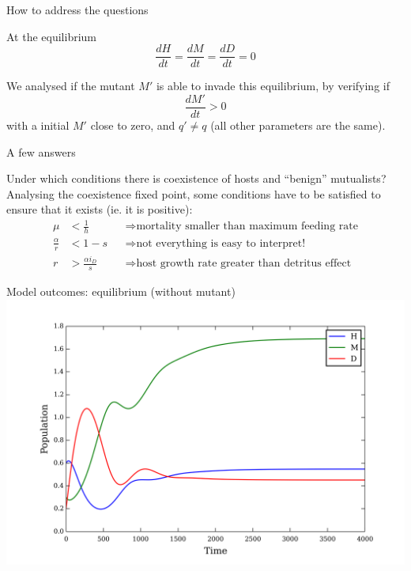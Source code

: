 \documentclass{beamer}
\begin{document}
\begin{frame}{How to address the questions}

    At the equilibrium $$\frac{dH}{dt} = \frac{dM}{dt} = \frac{dD}{dt} = 0$$

We analysed if the mutant $M'$ is able to invade this equilibrium, by
verifying if $$\frac{dM'}{dt} > 0$$ with a initial $M'$ close to zero, and $q' \neq q$
(all other parameters are the same).  

\end{frame}

\begin{frame}{A few answers}
    \begin{block}{Under which conditions there is coexistence of hosts and
        ``benign'' mutualists?}
        Analysing the coexistence fixed point, some conditions have to be
        satisfied to ensure that it exists (ie. it is positive):
$$\begin{aligned}
    \mu &< \frac{1}{h} &&\Rightarrow \text{mortality smaller than maximum
    feeding rate}\\
    \frac{\alpha}{r} &< 1 -s &&\Rightarrow \text{not everything is easy to
    interpret!}\\
    r &> \frac{\alpha i_D}{s} &&\Rightarrow \text{host growth rate greater than
    detritus effect}
   \end{aligned}$$
    \end{block}

\end{frame}

\begin{frame}{Model outcomes: equilibrium (without mutant)}
    \includegraphics[width=1\textwidth]{equ.png}
\end{frame}
\end{document}
